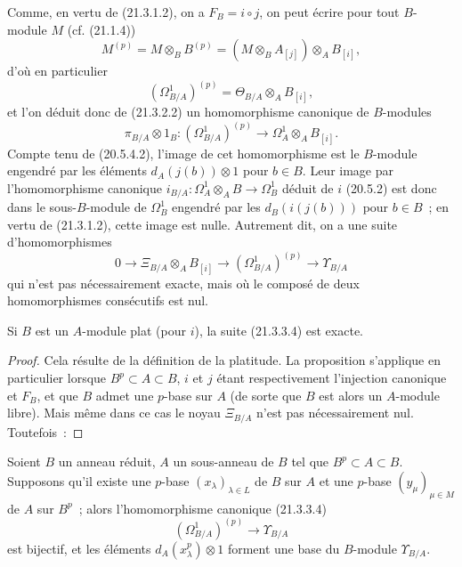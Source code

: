 \begin{env}[21.3.3]
\label{0.21.3.3-fr}
Comme, en vertu de (21.3.1.2), on a $F_B=i\circ j$, on peut écrire pour
tout $B$-module $M$ (cf. (21.1.4))
\begin{equation}
\tag{21.3.3.1}\label{0.21.3.3.1-fr}
M^{(p)}=M\otimes_B B^{(p)}=(M\otimes_B A_{[j]})\otimes_A B_{[i]},
\end{equation}
d'où en particulier
\begin{equation}
\tag{21.3.3.2}\label{0.21.3.3.2-fr}
(\Omega^1_{B/A})^{(p)}=\Theta_{B/A}\otimes_A B_{[i]},
\end{equation}
et l'on déduit donc de (21.3.2.2) un homomorphisme canonique de $B$-modules
\begin{equation}
\tag{21.3.3.3}\label{0.21.3.3.3-fr}
\pi_{B/A}\otimes1_B:(\Omega^1_{B/A})^{(p)}\longrightarrow
\Omega^1_A\otimes_A B_{[i]}.
\end{equation}
Compte tenu de (20.5.4.2), l'image de cet homomorphisme est le $B$-module
engendré par les éléments $d_A(j(b))\otimes1$ pour $b\in B$. Leur image
par l'homomorphisme canonique $i_{B/A}:\Omega^1_A\otimes_A B\to\Omega^1_B$
déduit de $i$ (20.5.2) est donc dans le sous-$B$-module de $\Omega^1_B$
engendré par les $d_B(i(j(b)))$ pour $b\in B$~; en vertu de (21.3.1.2),
cette image est nulle. Autrement dit, on a une suite d'homomorphismes
\begin{equation}
\tag{21.3.3.4}\label{0.21.3.3.4-fr}
0\to\Xi_{B/A}\otimes_A B_{[i]}\to(\Omega^1_{B/A})^{(p)}
\to\Upsilon_{B/A}
\end{equation}
qui n'est pas nécessairement exacte, mais où le composé de deux
homomorphismes consécutifs est nul.
\end{env}

\begin{proposition}[21.3.4]
\label{0.21.3.4-fr}
Si $B$ est un $A$-module plat (pour $i$), la suite (21.3.3.4) est exacte.
\end{proposition}
\begin{proof}
Cela résulte de la définition de la platitude. La proposition s'applique en
particulier lorsque $B^p\subset A\subset B$, $i$ et $j$ étant respectivement
l'injection canonique et $F_B$, et que $B$ admet une $p$-base sur $A$ (de sorte
que $B$ est alors un $A$-module libre). Mais même dans ce cas le noyau
$\Xi_{B/A}$ n'est pas nécessairement nul. Toutefois~:
\end{proof}

\begin{proposition}[21.3.5]
\label{0.21.3.5-fr}
Soient $B$ un anneau réduit, $A$ un sous-anneau de $B$ tel que
$B^p\subset A\subset B$. Supposons qu'il existe une $p$-base
$(x_\lambda)_{\lambda\in L}$ de $B$ sur $A$ et une $p$-base
$(y_\mu)_{\mu\in M}$ de $A$ sur $B^p$~; alors l'homomorphisme canonique
(21.3.3.4)
\begin{equation}
\tag{21.3.5.1}\label{0.21.3.5.1-fr}
(\Omega^1_{B/A})^{(p)}\longrightarrow\Upsilon_{B/A}
\end{equation}
est bijectif, et les éléments $d_A(x_\lambda^p)\otimes1$ forment une base
du $B$-module $\Upsilon_{B/A}$.
\end{proposition}

